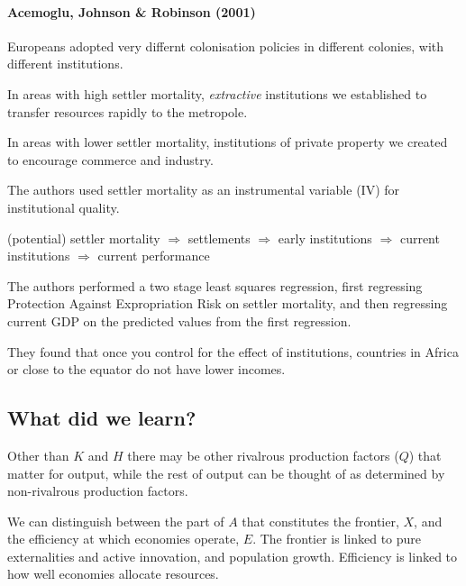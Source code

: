 \documentclass[11pt]{article}
\begin{document}
\begin{mdframed}
\paragraph{Acemoglu, Johnson \& Robinson (2001)} \mbox{}

    \cite{acemoglu2001} Europeans adopted very differnt colonisation policies in different colonies, with different institutions.

    In areas with high settler mortality, \textit{extractive} institutions we established to transfer resources rapidly to the metropole.

    In areas with lower settler mortality, institutions of private property we created to encourage commerce and industry.

    The authors used settler mortality as an instrumental variable (IV) for institutional quality.

    (potential) settler mortality $\Rightarrow$ settlements $\Rightarrow$ early institutions $\Rightarrow$ current institutions $\Rightarrow$ current performance

    The authors performed a two stage least squares regression, first regressing Protection Against Expropriation Risk on settler mortality, and then regressing current GDP on the predicted values from the first regression.

    They found that once you control for the effect of institutions, countries in Africa or close to the equator do not have lower incomes.
\end{mdframed}

\subsection{What did we learn?}

Other than $K$ and $H$ there may be other rivalrous production factors ($Q$) that matter for output, while the rest of output can be thought of as determined by non-rivalrous production factors.

We can distinguish between the part of $A$ that constitutes the frontier, $X$, and the efficiency at which economies operate, $E$. The frontier is linked to pure externalities and active innovation, and population growth. Efficiency is linked to how well economies allocate resources.

\newpage
\end{document}
